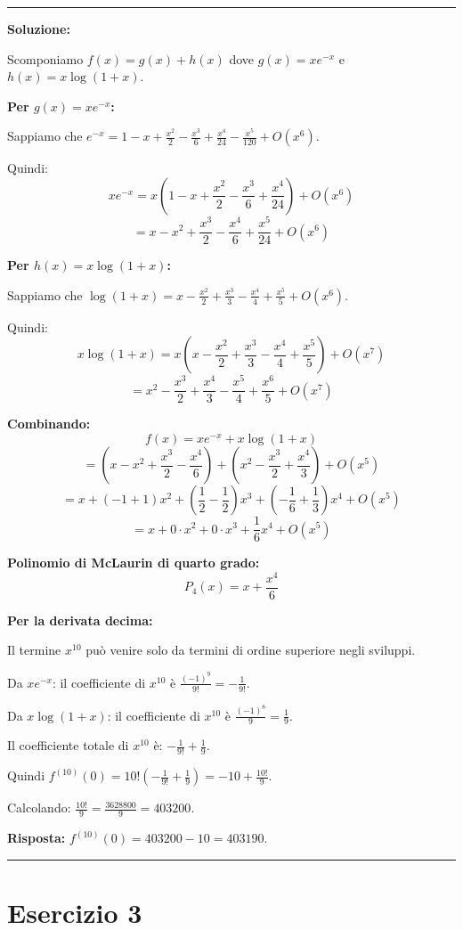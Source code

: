 \documentclass[12pt, a4paper]{article}
\newenvironment{solution}
{\par\noindent\rule{\textwidth}{0.4pt}\par\textbf{Soluzione:}\medskip\par}
{\par\rule{\textwidth}{0.4pt}\par\bigskip}
\begin{document}
\begin{solution}
Scomponiamo $f(x) = g(x) + h(x)$ dove $g(x) = xe^{-x}$ e $h(x) = x\log(1+x)$.

\textbf{Per $g(x) = xe^{-x}$:}

Sappiamo che $e^{-x} = 1 - x + \frac{x^2}{2} - \frac{x^3}{6} + \frac{x^4}{24} - \frac{x^5}{120} + O(x^6)$.

Quindi:
\[
xe^{-x} = x\left(1 - x + \frac{x^2}{2} - \frac{x^3}{6} + \frac{x^4}{24}\right) + O(x^6)
\]
\[
= x - x^2 + \frac{x^3}{2} - \frac{x^4}{6} + \frac{x^5}{24} + O(x^6)
\]

\textbf{Per $h(x) = x\log(1+x)$:}

Sappiamo che $\log(1+x) = x - \frac{x^2}{2} + \frac{x^3}{3} - \frac{x^4}{4} + \frac{x^5}{5} + O(x^6)$.

Quindi:
\[
x\log(1+x) = x\left(x - \frac{x^2}{2} + \frac{x^3}{3} - \frac{x^4}{4} + \frac{x^5}{5}\right) + O(x^7)
\]
\[
= x^2 - \frac{x^3}{2} + \frac{x^4}{3} - \frac{x^5}{4} + \frac{x^6}{5} + O(x^7)
\]

\textbf{Combinando:}
\[
f(x) = xe^{-x} + x\log(1+x)
\]
\[
= \left(x - x^2 + \frac{x^3}{2} - \frac{x^4}{6}\right) + \left(x^2 - \frac{x^3}{2} + \frac{x^4}{3}\right) + O(x^5)
\]
\[
= x + (-1 + 1)x^2 + \left(\frac{1}{2} - \frac{1}{2}\right)x^3 + \left(-\frac{1}{6} + \frac{1}{3}\right)x^4 + O(x^5)
\]
\[
= x + 0 \cdot x^2 + 0 \cdot x^3 + \frac{1}{6}x^4 + O(x^5)
\]

\textbf{Polinomio di McLaurin di quarto grado:}
\[
P_4(x) = x + \frac{x^4}{6}
\]

\textbf{Per la derivata decima:}

Il termine $x^{10}$ può venire solo da termini di ordine superiore negli sviluppi. 

Da $xe^{-x}$: il coefficiente di $x^{10}$ è $\frac{(-1)^9}{9!} = -\frac{1}{9!}$.

Da $x\log(1+x)$: il coefficiente di $x^{10}$ è $\frac{(-1)^8}{9} = \frac{1}{9}$.

Il coefficiente totale di $x^{10}$ è: $-\frac{1}{9!} + \frac{1}{9}$.

Quindi $f^{(10)}(0) = 10! \left(-\frac{1}{9!} + \frac{1}{9}\right) = -10 + \frac{10!}{9}$.

Calcolando: $\frac{10!}{9} = \frac{3628800}{9} = 403200$.

\textbf{Risposta:} $f^{(10)}(0) = 403200 - 10 = 403190$.
\end{solution}

\newpage

\section*{Esercizio 3}
\end{document}
